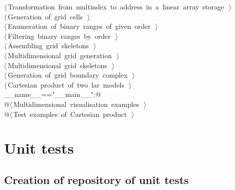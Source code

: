 \documentclass[11pt,oneside]{article}	%
\begin{document}
\begin{flushleft}
\begin{list}{}{}
\mbox{}\verb@@\hbox{$\langle\,$Transformation from multindex to address in a linear array storage\nobreak\ {\footnotesize {}}$\,\rangle$}\verb@@\\
\mbox{}\verb@@\hbox{$\langle\,$Generation of grid cells\nobreak\ {\footnotesize {}}$\,\rangle$}\verb@@\\
\mbox{}\verb@@\hbox{$\langle\,$Enumeration of binary ranges of given order\nobreak\ {\footnotesize {}}$\,\rangle$}\verb@@\\
\mbox{}\verb@@\hbox{$\langle\,$Filtering binary ranges by order\nobreak\ {\footnotesize {}}$\,\rangle$}\verb@@\\
\mbox{}\verb@@\hbox{$\langle\,$Assembling grid skeletons\nobreak\ {\footnotesize {}}$\,\rangle$}\verb@@\\
\mbox{}\verb@@\hbox{$\langle\,$Multidimensional grid generation\nobreak\ {\footnotesize {}}$\,\rangle$}\verb@@\\
\mbox{}\verb@@\hbox{$\langle\,$Multidimensional grid skeletons\nobreak\ {\footnotesize {}}$\,\rangle$}\verb@@\\
\mbox{}\verb@@\hbox{$\langle\,$Generation of grid boundary complex\nobreak\ {\footnotesize {}}$\,\rangle$}\verb@@\\
\mbox{}\verb@@\hbox{$\langle\,$Cartesian product of two lar models\nobreak\ {\footnotesize {}}$\,\rangle$}\verb@@\\
\mbox{}\verb@if __name__=="__main__":@\\
\mbox{}\verb@   @\hbox{$\langle\,$Multidimensional visualisation examples\nobreak\ {\footnotesize {}}$\,\rangle$}\verb@@\\
\mbox{}\verb@   @\hbox{$\langle\,$Test examples of Cartesian product\nobreak\ {\footnotesize {}}$\,\rangle$}\verb@@\\
\mbox{}\verb@@{\NWsep}
\end{list}
\vspace{-2ex}
\end{flushleft}


\section{Unit tests}
\label{sec:tests}

\subsection{Creation of repository of unit tests}
\end{document}
